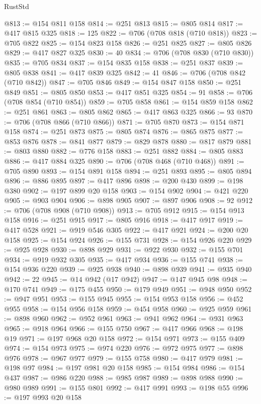 \begin{lexlean}{RustStd}
\begin{coremodule}
{\begin{coremodule}
{{{{{{{{{{{{{{{{{{{{{{{{{{{{{{{{{{{{{{{@813 := @154 @811 @158
@814 := @251 @813
@815 := @805 @814
@817 := @417 @815 @325
@818 := 125
@822 := @706 (@708 @818 (@710 @818))
@823 := @705 @822
@825 := @154 @823 @158
@826 := @251 @825
@827 := @805 @826
@829 := @417 @827 @325
@830 := 40
@834 := @706 (@708 @830 (@710 @830))
@835 := @705 @834
@837 := @154 @835 @158
@838 := @251 @837
@839 := @805 @838
@841 := @417 @839 @325
@842 := 41
@846 := @706 (@708 @842 (@710 @842))
@847 := @705 @846
@849 := @154 @847 @158
@850 := @251 @849
@851 := @805 @850
@853 := @417 @851 @325
@854 := 91
@858 := @706 (@708 @854 (@710 @854))
@859 := @705 @858
@861 := @154 @859 @158
@862 := @251 @861
@863 := @805 @862
@865 := @417 @863 @325
@866 := 93
@870 := @706 (@708 @866 (@710 @866))
@871 := @705 @870
@873 := @154 @871 @158
@874 := @251 @873
@875 := @805 @874
@876 := @865 @875
@877 := @853 @876
@878 := @841 @877
@879 := @829 @878
@880 := @817 @879
@881 := @803 @880
@882 := @776 @158
@883 := @251 @882
@884 := @805 @883
@886 := @417 @884 @325
@890 := @706 (@708 @468 (@710 @468))
@891 := @705 @890
@893 := @154 @891 @158
@894 := @251 @893
@895 := @805 @894
@896 := @886 @895
@897 := @417 @896
@898 := @200 @430
@899 := @198 @380
@902 := @197 @899 @20 @158
@903 := @154 @902
@904 := @421 @220
@905 := @903 @904
@906 := @898 @905
@907 := @897 @906
@908 := 92
@912 := @706 (@708 @908 (@710 @908))
@913 := @705 @912
@915 := @154 @913 @158
@916 := @251 @915
@917 := @805 @916
@918 := @417 @917
@919 := @417 @528
@921 := @919 @546 @305
@922 := @417 @921
@924 := @200 @20 @158
@925 := @154 @924
@926 := @155 @731
@928 := @154 @926 @220
@929 := @925 @928
@930 := @898 @929
@931 := @922 @930
@932 := @155 @701
@934 := @919 @932 @305
@935 := @417 @934
@936 := @155 @741
@938 := @154 @936 @220
@939 := @925 @938
@940 := @898 @939
@941 := @935 @940
@942 := 22
@945 := @14 @942 (@17 @942)
@947 := @147 @945 @98
@948 := @170 @741
@949 := @175 @455
@950 := @179 @949
@951 := @948 @950
@952 := @947 @951
@953 := @155 @945
@955 := @154 @953 @158
@956 := @452 @955
@958 := @154 @956 @158
@959 := @454 @958
@960 := @925 @959
@961 := @898 @960
@962 := @952 @961
@963 := @941 @962
@964 := @931 @963
@965 := @918 @964
@966 := @155 @750
@967 := @417 @966
@968 := @198 @19
@971 := @197 @968 @20 @158
@972 := @154 @971
@973 := @155 @409
@974 := @154 @973
@975 := @974 @220
@976 := @972 @975
@977 := @898 @976
@978 := @967 @977
@979 := @155 @758
@980 := @417 @979
@981 := @198 @97
@984 := @197 @981 @20 @158
@985 := @154 @984
@986 := @154 @437
@987 := @986 @220
@988 := @985 @987
@989 := @898 @988
@990 := @980 @989
@991 := @155 @801
@992 := @417 @991
@993 := @198 @55
@996 := @197 @993 @20 @158
}}}}}}}}}}}}}}}}}}}}}}}}}}}}}}}}}}}}}}}
\end{coremodule}}
\end{coremodule}
\end{lexlean}
